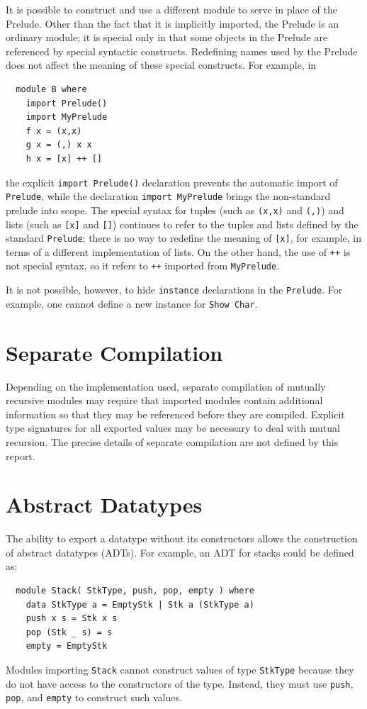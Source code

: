 It is possible to construct and use a different module to serve in
place of the Prelude.  Other than the fact that it is implicitly
imported, the Prelude is an ordinary \Haskell{} module; it is special
only in that some objects in the Prelude are referenced by special
syntactic constructs.  Redefining names used by the Prelude does not
affect the meaning of these special constructs.  For example, in
\bprog
{\small\begin{verbatim}
  module B where
    import Prelude()
    import MyPrelude
    f x = (x,x)
    g x = (,) x x
    h x = [x] ++ []
\end{verbatim}}
\eprog
the explicit \mbox{\tt import\ Prelude()} declaration prevents the automatic
import of \mbox{\tt Prelude}, while the declaration \mbox{\tt import\ MyPrelude} brings the
non-standard prelude into scope.  
The special syntax for tuples (such as \mbox{\tt (x,x)} and \mbox{\tt (,)}) and lists
(such as \mbox{\tt [x]} and \mbox{\tt []}) continues to refer to the tuples and lists
defined by the standard \mbox{\tt Prelude};
there is no way to redefine the meaning of \mbox{\tt [x]}, for example, in terms of a
different implementation of lists.
On the other hand, the use of \mbox{\tt ++} is not special syntax, so it refers
to \mbox{\tt ++} imported from \mbox{\tt MyPrelude}.

It is not possible, however, to hide \mbox{\tt instance} declarations in the
\mbox{\tt Prelude}.  For example, one cannot define a new instance for \mbox{\tt Show\ Char}.

\section{Separate Compilation}
Depending on the \Haskell{} implementation used, separate compilation
of mutually recursive modules may require that imported modules contain
additional information so that they may be referenced before they are
compiled.  Explicit type signatures for all exported values may be
necessary to deal with mutual recursion.  The
precise details of separate compilation are not defined by this
report. 

\section{Abstract Datatypes}
\label{abstract-types}

The ability to export a datatype without its constructors
allows the construction of abstract datatypes (ADTs).  For example,
an ADT for stacks could be defined as:
\bprog
{\small\begin{verbatim}
  module Stack( StkType, push, pop, empty ) where
    data StkType a = EmptyStk | Stk a (StkType a)
    push x s = Stk x s
    pop (Stk _ s) = s
    empty = EmptyStk
\end{verbatim}}
\eprog
Modules importing \mbox{\tt Stack} cannot construct values of type \mbox{\tt StkType}
because they do not have access to the constructors of the type.
Instead, they must use \mbox{\tt push}, \mbox{\tt pop}, and \mbox{\tt empty} to construct such values.


